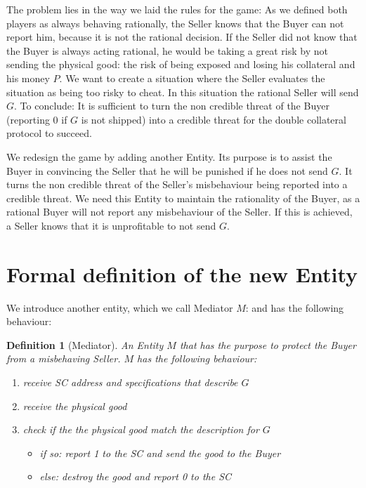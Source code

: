 \documentclass{cacthesis}
\newcommand{\authnote}[3]{{ \footnotesize \textbf{#1[#2: #3]~}}}
\newcommand{\niknote}[1]{\authnote{\color{red}}{Nikos}{#1}}
\newtheorem{definition}{Definition}
\begin{document}
The problem lies in the way we laid the rules for the game: As we defined both players as always behaving rationally, the Seller knows that the Buyer can not report him, because it is not the rational decision.
If the Seller did not know that the Buyer is always acting rational, he would be taking a great risk by not sending the physical good: the risk of being exposed and losing his collateral and his money $P$.
We want to create a situation where the Seller evaluates the situation as being too risky to cheat. In this situation the rational Seller will send $G$.
To conclude: It is sufficient to turn the non credible threat of the Buyer (reporting 0 if $G$ is not shipped) into a credible threat for the double collateral protocol to succeed.\newline

We redesign the game by adding another Entity. Its purpose is to assist the Buyer in convincing the Seller that he will be punished if he does not send $G$. It turns the non credible threat of the Seller's misbehaviour being reported into a credible threat. We need this Entity to maintain the rationality of the Buyer, as a rational Buyer will not report any misbehaviour of the Seller.
If this is achieved, a Seller knows that it is unprofitable to not send $G$.\newline


\section{Formal definition of the new Entity}
\label{sec:formal-definition-mediator}
We introduce another entity, which we call Mediator $M$: and has the following behaviour:
\begin{definition}[Mediator]
\label{def:mediator}
An Entity $M$ that has the purpose to protect the Buyer from a misbehaving Seller. $M$ has the following behaviour:
\begin{enumerate}
    \item receive SC address and specifications that describe $G$
    \item receive the physical good
    \item check if the the physical good match the description for $G$
    \begin{itemize}
        \item if so: report 1 to the SC and send the good to the Buyer
        \item else: destroy the good and report 0 to the SC\newline
    \end{itemize}
\end{enumerate}
\end{definition}
\end{document}
